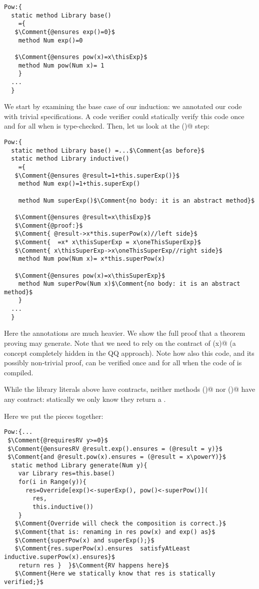 \begin{lstlisting}
Pow:{
  static method Library base()
    ={
   $\Comment{@ensures exp()=0}$
    method Num exp()=0 
    
   $\Comment{@ensures pow(x)=x\thisExp}$
    method Num pow(Num x)= 1 
    }
  ...
  }
\end{lstlisting}

We start by examining the base case of our induction: we annotated our 
code with trivial specifications.
A code verifier could statically verify this code 
once and for all when \Q@Pow@ is type-checked.
Then, let us look at the \Q@inductive()@ step:

\begin{lstlisting}
Pow:{
  static method Library base() =...$\Comment{as before}$
  static method Library inductive() 
    ={
   $\Comment{@ensures @result=1+this.superExp()}$
    method Num exp()=1+this.superExp() 
      
    method Num superExp()$\Comment{no body: it is an abstract method}$
      
   $\Comment{@ensures @result=x\thisExp}$
   $\Comment{@proof:}$
   $\Comment{ @result->x*this.superPow(x)//left side}$
   $\Comment{  =x* x\thisSuperExp = x\oneThisSuperExp}$
   $\Comment{ x\thisSuperExp->x\oneThisSuperExp//right side}$
    method Num pow(Num x)= x*this.superPow(x)
      
   $\Comment{@ensures pow(x)=x\thisSuperExp}$
    method Num superPow(Num x)$\Comment{no body: it is an abstract method}$
    }
  ...
  }
\end{lstlisting}

Here the annotations are much heavier.
We show the full proof that a theorem proving may generate.
Note that we need to rely on the contract of \Q@superPow(x)@ (a concept completely hidden in the QQ approach).
Note how also this code, and its possibly non-trivial proof, can be verified once and for all when the code of \Q@Pow@ is compiled.

While the library literals above have contracts,
neither methods \Q@base()@ nor \Q@inductive()@ have any contract:
statically we only know they return a \Q@Library@.

Here we put the pieces together:

\begin{lstlisting}
Pow:{...
 $\Comment{@requiresRV y>=0}$
 $\Comment{@ensuresRV @result.exp().ensures = (@result = y)}$
 $\Comment{and @result.pow(x).ensures = (@result = x\powerY)}$
  static method Library generate(Num y){
    var Library res=this.base()
    for(i in Range(y)){
      res=Override[exp()<-superExp(), pow()<-superPow()](
        res,
        this.inductive())
    }
   $\Comment{Override will check the composition is correct.}$
   $\Comment{that is: renaming in res pow(x) and exp() as}$
   $\Comment{superPow(x) and superExp();}$
   $\Comment{res.superPow(x).ensures  satisfyAtLeast inductive.superPow(x).ensures}$
    return res }  }$\Comment{RV happens here}$
   $\Comment{Here we statically know that res is statically verified;}$
\end{lstlisting}


